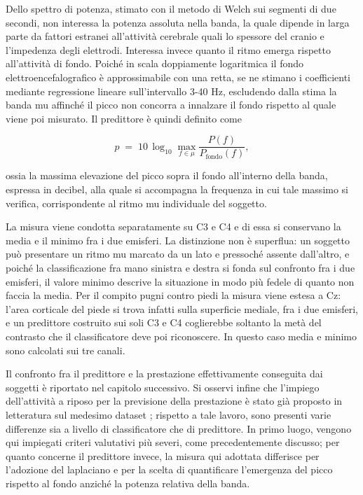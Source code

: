 Dello spettro di potenza, stimato con il metodo di Welch sui segmenti di due secondi, non interessa la potenza assoluta nella banda, la quale dipende in larga parte da fattori estranei all’attività cerebrale quali lo spessore del cranio e l’impedenza degli elettrodi. Interessa invece quanto il ritmo emerga rispetto all’attività di fondo. Poiché in scala doppiamente logaritmica il fondo elettroencefalografico è approssimabile con una retta, se ne stimano i coefficienti mediante regressione lineare sull’intervallo 3-40 Hz, escludendo dalla stima la banda mu affinché il picco non concorra a innalzare il fondo rispetto al quale viene poi misurato. Il predittore è quindi definito come

\[
p \;=\; 10 \, \log_{10} \max_{f \in \mu} \frac{P(f)}{P_{\text{fondo}}(f)} ,
\]

ossia la massima elevazione del picco sopra il fondo all’interno della banda, espressa in decibel, alla quale si accompagna la frequenza in cui tale massimo si verifica, corrispondente al ritmo mu individuale del soggetto.

La misura viene condotta separatamente su C3 e C4 e di essa si conservano la media e il minimo fra i due emisferi. La distinzione non è superflua: un soggetto può presentare un ritmo mu marcato da un lato e pressoché assente dall’altro, e poiché la classificazione fra mano sinistra e destra si fonda sul confronto fra i due emisferi, il valore minimo descrive la situazione in modo più fedele di quanto non faccia la media. Per il compito pugni contro piedi la misura viene estesa a Cz: l'area corticale del piede si trova infatti sulla superficie mediale, fra i due emisferi, e un predittore costruito sui soli C3 e C4 coglierebbe soltanto la metà del contrasto che il classificatore deve poi riconoscere. In questo caso media e minimo sono calcolati sui tre canali.

Il confronto fra il predittore e la prestazione effettivamente conseguita dai soggetti è riportato nel capitolo successivo. Si osservi infine che l’impiego dell’attività a riposo per la previsione della prestazione è stato già proposto in letteratura sul medesimo dataset \cite{Wang2022-pi}; rispetto a tale lavoro, sono presenti varie differenze sia a livello di classificatore che di predittore. In primo luogo, vengono qui impiegati criteri valutativi più severi, come precedentemente discusso; per quanto concerne il predittore invece, la misura qui adottata differisce per l'adozione del laplaciano e per la scelta di quantificare l'emergenza del picco rispetto al fondo anziché la potenza relativa della banda.